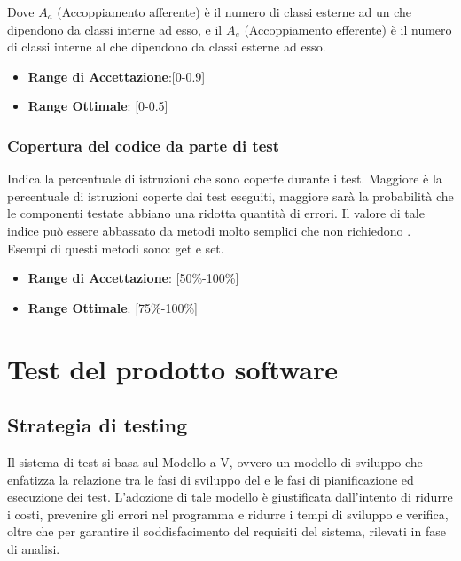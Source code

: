 \documentclass[12pt,a4paper]{article}
\begin{document}
Dove $A_a$ (Accoppiamento afferente) è il numero di classi esterne ad un  che dipendono da classi interne ad esso, e il $A_e$ (Accoppiamento efferente) è il numero di classi interne al  che dipendono da classi esterne ad esso.

\begin{itemize}
\item \textbf{Range di Accettazione}:[0-0.9]
\item \textbf{Range Ottimale}: [0-0.5]
\end{itemize}

\subsubsection{Copertura del codice da parte di test}
Indica la percentuale di istruzioni che sono coperte durante i test. Maggiore è la percentuale di istruzioni coperte dai test eseguiti, maggiore sarà la probabilità che le componenti testate abbiano una ridotta quantità di errori. Il valore di tale indice può essere abbassato da metodi molto semplici che non richiedono . Esempi di questi metodi sono: get e set.

\begin{itemize}
\item \textbf{Range di Accettazione}: [50\%-100\%]
\item \textbf{Range Ottimale}: [75\%-100\%]
\end{itemize}

\newpage

\section{Test del prodotto software}\label{test}

\subsection{Strategia di testing}\label{test_strategia}
Il sistema di test si basa sul Modello a V, ovvero un modello di sviluppo che enfatizza la relazione tra le fasi di sviluppo del  e le fasi di pianificazione ed esecuzione dei test. L'adozione di tale modello è giustificata dall'intento di ridurre i costi, prevenire gli errori nel programma e ridurre i tempi di sviluppo e verifica, oltre che per garantire il soddisfacimento del requisiti del sistema, rilevati in fase di analisi.
\end{document}
